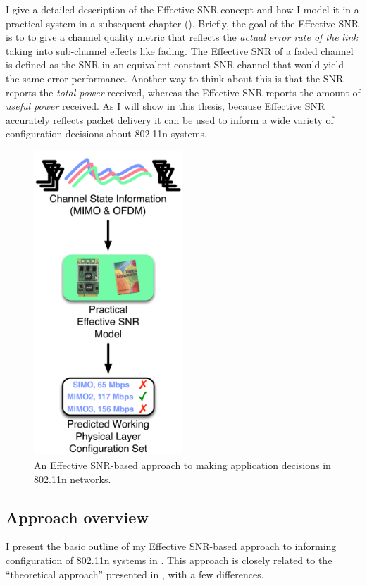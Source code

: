 I give a detailed description of the Effective SNR concept and how I model it in a practical system in a subsequent chapter (). Briefly, the goal of the Effective SNR is to to give a channel quality metric that reflects the \emph{actual error rate of the link} taking into sub-channel effects like fading. The Effective SNR of a faded channel is defined as the SNR in an equivalent constant-SNR channel that would yield the same error performance. Another way to think about this is that the SNR reports the \emph{total power} received, whereas the Effective SNR reports the amount of \emph{useful power} received. As I will show in this thesis, because Effective SNR accurately reflects packet delivery it can be used to inform a wide variety of configuration decisions about 802.11n systems.

\begin{figure}[t]
	\centering
	\includegraphics[width=2.2in]{figures/selection_esnr}
	\caption[Effective SNR-based approach to making application decisions]{\label{fig:selection_esnr}An Effective SNR-based approach to making application decisions in 802.11n networks.}
\end{figure}

\subsection{Approach overview}
I present the basic outline of my Effective SNR-based approach to informing configuration of 802.11n systems in . This approach is closely related to the ``theoretical approach'' presented in , with a few differences.

